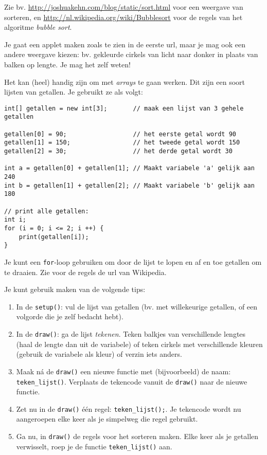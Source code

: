 \documentclass[a4paper,11pt]{article}
\begin{document}
Zie bv. \url{http://joshuakehn.com/blog/static/sort.html} voor een weergave van sorteren, en \url{http://nl.wikipedia.org/wiki/Bubblesort} voor de regels van het algoritme \emph{bubble sort}.

Je gaat een applet maken zoals te zien in de eerste url, maar je mag ook een andere weergave kiezen: bv. gekleurde cirkels van licht naar donker in plaats van balken op lengte.  Je mag het zelf weten!

Het kan (heel) handig zijn om met \emph{arrays} te gaan werken.  Dit zijn een soort lijsten van getallen.  Je gebruikt ze als volgt:
\begin{verbatim}
int[] getallen = new int[3];       // maak een lijst van 3 gehele getallen

getallen[0] = 90;                  // het eerste getal wordt 90
getallen[1] = 150;                 // het tweede getal wordt 150
getallen[2] = 30;                  // het derde getal wordt 30

int a = getallen[0] + getallen[1]; // Maakt variabele 'a' gelijk aan 240
int b = getallen[1] + getallen[2]; // Maakt variabele 'b' gelijk aan 180

// print alle getallen:
int i;
for (i = 0; i <= 2; i ++) {
    print(getallen[i]);
}
\end{verbatim}
Je kunt een \verb|for|-loop gebruiken om door de lijst te lopen en af en toe getallen om te draaien.  Zie voor de regels de url van Wikipedia.

Je kunt gebruik maken van de volgende tips:
\begin{enumerate}
    \item In de \verb|setup()|: vul de lijst van getallen (bv. met willekeurige getallen, of een volgorde die je zelf bedacht hebt).
    \item In de \verb|draw()|: ga de lijst \emph{tekenen}.  Teken balkjes van verschillende lengtes (haal de lengte dan uit de variabele) of teken cirkels met verschillende kleuren (gebruik de variabele als kleur) of verzin iets anders.
    \item Maak ná de \verb|draw()| een nieuwe functie met (bijvoorbeeld) de naam: \verb|teken_lijst()|.  Verplaats de tekencode vanuit de \verb|draw()| naar de nieuwe functie.
    \item Zet nu in de \verb|draw()| één regel: \verb|teken_lijst();|.  Je tekencode wordt nu aangeroepen elke keer als je simpelweg die regel gebruikt.
    \item Ga nu, in \verb|draw()| de regels voor het sorteren maken.  Elke keer als je getallen verwisselt, roep je de functie \verb|teken_lijst()| aan.
\end{enumerate}
\end{document}
